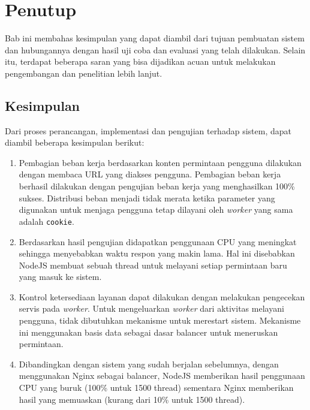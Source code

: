 \documentclass{ta-its}
\begin{document}
		\chapter{Penutup}
			Bab ini membahas kesimpulan yang dapat diambil dari tujuan pembuatan sistem dan hubungannya dengan hasil uji coba dan evaluasi yang telah dilakukan. Selain itu, terdapat beberapa saran yang bisa dijadikan acuan untuk melakukan pengembangan dan penelitian lebih lanjut.
			
			\section{Kesimpulan}
				Dari proses perancangan, implementasi dan pengujian terhadap sistem, dapat diambil beberapa kesimpulan berikut:
				\begin{enumerate}
					\item Pembagian beban kerja berdasarkan konten permintaan pengguna dilakukan dengan membaca URL yang diakses pengguna. Pembagian beban kerja berhasil dilakukan dengan pengujian beban kerja yang menghasilkan 100\% sukses. Distribusi beban menjadi tidak merata ketika parameter yang digunakan untuk menjaga pengguna tetap dilayani oleh \textit{worker} yang sama adalah \texttt{cookie}. 
					\item Berdasarkan hasil pengujian didapatkan penggunaan CPU yang meningkat sehingga menyebabkan waktu respon yang makin lama. Hal ini disebabkan NodeJS membuat sebuah thread untuk melayani setiap permintaan baru yang masuk ke sistem.
					\item Kontrol ketersediaan layanan dapat dilakukan dengan melakukan pengecekan servis pada \textit{worker}. Untuk mengeluarkan \textit{worker} dari aktivitas melayani pengguna, tidak dibutuhkan mekanisme untuk merestart sistem. Mekanisme ini menggunakan basis data sebagai dasar balancer untuk meneruskan permintaan.
					\item Dibandingkan dengan sistem yang sudah berjalan sebelumnya, dengan menggunakan Nginx sebagai balancer, NodeJS memberikan hasil penggunaan CPU yang buruk (100\% untuk 1500 thread) sementara Nginx memberikan hasil yang memuaskan (kurang dari 10\% untuk 1500 thread).
				\end{enumerate}
			
\end{document}
